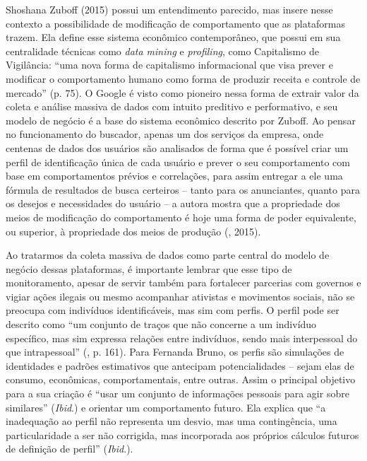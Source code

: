 Shoshana Zuboff (2015) possui um entendimento parecido, mas insere nesse
contexto a possibilidade de modificação de comportamento que as
plataformas trazem. Ela define esse sistema econômico contemporâneo, que
possui em sua centralidade técnicas como \emph{data mining} e
\emph{profiling}, como Capitalismo de Vigilância: ``uma nova forma de
capitalismo informacional que visa prever e modificar o comportamento
humano como forma de produzir receita e controle de mercado'' (p. 75). O
Google é visto como pioneiro nessa forma de extrair valor da coleta e
análise massiva de dados com intuito preditivo e performativo, e seu
modelo de negócio é a base do sistema econômico descrito por Zuboff. Ao
pensar no funcionamento do buscador, apenas um dos serviços da empresa,
onde centenas de dados dos usuários são analisados de forma que é
possível criar um perfil de identificação única de cada usuário e prever
o seu comportamento com base em comportamentos prévios e correlações,
para assim entregar a ele uma fórmula de resultados de busca certeiros
-- tanto para os anunciantes, quanto para os desejos e necessidades do
usuário -- a autora mostra que a propriedade dos meios de modificação do
comportamento é hoje uma forma de poder equivalente, ou superior, à
propriedade dos meios de produção (, 2015).

Ao tratarmos da coleta massiva de dados como parte central do modelo de
negócio dessas plataformas, é importante lembrar que esse tipo de
monitoramento, apesar de servir também para fortalecer parcerias com
governos e vigiar ações ilegais ou mesmo acompanhar ativistas e
movimentos sociais, não se preocupa com indivíduos identificáveis, mas
sim com perfis. O perfil pode ser descrito como ``um conjunto de traços
que não concerne a um indivíduo específico, mas sim expressa relações
entre indivíduos, sendo mais interpessoal do que intrapessoal'' (, p.
161). Para Fernanda Bruno, os perfis são simulações de identidades e
padrões estimativos que antecipam potencialidades ­-- sejam elas de
consumo, econômicas, comportamentais, entre outras. Assim o principal
objetivo para a sua criação é ``usar um conjunto de informações pessoais
para agir sobre similares'' (\emph{Ibid}.) e orientar um comportamento futuro.
Ela explica que ``a inadequação ao perfil não representa um desvio, mas
uma contingência, uma particularidade a ser não corrigida, mas
incorporada aos próprios cálculos futuros de definição de
perfil'' (\emph{Ibid}.).

